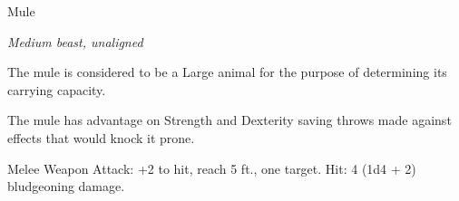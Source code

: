 \begin{monsterbox}{Mule}
\begin{hangingpar}
\textit{Medium beast, unaligned}
\end{hangingpar}
\dndline%
\basics[%
armorclass = 10,
hitpoints = 2d8 + 2,
speed = {40 ft.}
]
\dndline%
\stats[%
STR = \stat{14},
DEX = \stat{10},
CON = \stat{13},
INT = \stat{2},
WIS = \stat{10},
CHA = \stat{5}
]
\dndline%
\details[%
skills={},
damageimmunities={},
savingthrows={},
conditionimmunities={},
damageresistances={},
damagevulnerabilities={},
senses={passive Perception 10},
challenge=1/8
]
\dndline%
\begin{monsteraction}
The mule is considered to be a Large animal for the purpose of determining its carrying capacity.
\end{monsteraction}
\begin{monsteraction}
The mule has advantage on Strength and Dexterity saving throws made against effects that would knock it prone.
\end{monsteraction}
\begin{monsteraction}[Hooves]
Melee Weapon Attack: +2 to hit, reach 5 ft., one target. Hit: 4 (1d4 + 2) bludgeoning damage.
\end{monsteraction}
\end{monsterbox}